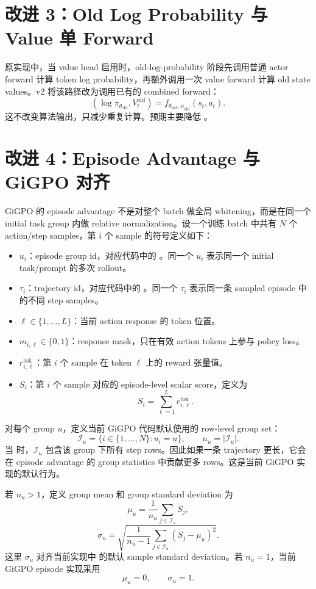 \documentclass[10pt]{ctexart}
\begin{document}
\section*{改进 3：Old Log Probability 与 Value 单 Forward}
原实现中，当 value head 启用时，old-log-probability 阶段先调用普通 actor forward 计算 token log probability，再额外调用一次 value forward 计算 old state values。v2 将该路径改为调用已有的 combined forward：
\[
(\log\pi_{\theta_{\mathrm{old}}}, V^{\mathrm{old}}_t)
= f_{\theta_{\mathrm{old}},\psi_{\mathrm{old}}}(s_t,a_t).
\]
这不改变算法输出，只减少重复计算。预期主要降低 。

\section*{改进 4：Episode Advantage 与 GiGPO 对齐}
GiGPO 的 episode advantage 不是对整个 batch 做全局 whitening，而是在同一个 initial task group 内做 relative normalization。设一个训练 batch 中共有 $N$ 个 action/step samples，第 $i$ 个 sample 的符号定义如下：
\begin{itemize}
\item $u_i$：episode group id，对应代码中的 。同一个 $u_i$ 表示同一个 initial task/prompt 的多次 rollout。
\item $\tau_i$：trajectory id，对应代码中的 。同一个 $\tau_i$ 表示同一条 sampled episode 中的不同 step samples。
\item $\ell\in\{1,\ldots,L\}$：当前 action response 的 token 位置。
\item $m_{i,\ell}\in\{0,1\}$：response mask，只在有效 action tokens 上参与 policy loss。
\item $r^{\mathrm{tok}}_{i,\ell}$：第 $i$ 个 sample 在 token $\ell$ 上的 reward 张量值。
\item $S_i$：第 $i$ 个 sample 对应的 episode-level scalar score，定义为
\[
S_i=\sum_{\ell=1}^{L} r^{\mathrm{tok}}_{i,\ell}.
\]
\end{itemize}

对每个 group $u$，定义当前 GiGPO 代码默认使用的 row-level group set：
\[
\mathcal I_u=\{i\in\{1,\ldots,N\}:u_i=u\},
\qquad
n_u=|\mathcal I_u|.
\]
当  时，$\mathcal I_u$ 包含该 group 下所有 step rows。因此如果一条 trajectory 更长，它会在 episode advantage 的 group statistics 中贡献更多 rows。这是当前 GiGPO 实现的默认行为。

若 $n_u>1$，定义 group mean 和 group standard deviation 为
\[
\mu_u=\frac{1}{n_u}\sum_{j\in\mathcal I_u}S_j,
\]
\[
\sigma_u=\sqrt{\frac{1}{n_u-1}\sum_{j\in\mathcal I_u}(S_j-\mu_u)^2}.
\]
这里 $\sigma_u$ 对齐当前实现中  的默认 sample standard deviation。若 $n_u=1$，当前 GiGPO episode 实现采用
\[
\mu_u=0,
\qquad
\sigma_u=1.
\]
\end{document}
